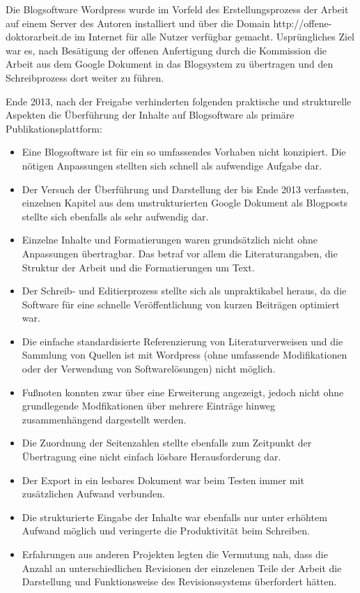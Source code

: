 Die Blogsoftware Wordpress wurde im Vorfeld des Erstellungsprozess der Arbeit auf einem Server des Autoren installiert und über die Domain http://offene-doktorarbeit.de im Internet für alle Nutzer verfügbar gemacht. Usprüngliches Ziel war es, nach Besätigung der offenen Anfertigung durch die Kommission die Arbeit aus dem Google Dokument in das Blogsystem zu übertragen und den Schreibprozess dort weiter zu führen.

Ende 2013, nach der Freigabe verhinderten folgenden praktische und strukturelle Aspekten die Überführung der Inhalte auf Blogsoftware als primäre Publikationsplattform:
\begin{itemize}
\item Eine Blogsoftware ist für ein so umfassendes Vorhaben nicht konzipiert. Die nötigen Anpassungen stellten sich schnell als aufwendige Aufgabe dar.
\item Der Versuch der Überführung und Darstellung der bis Ende 2013 verfassten, einzelnen Kapitel aus dem unstrukturierten Google Dokument als Blogposts stellte sich ebenfalls als sehr aufwendig dar.
\item  Einzelne Inhalte und Formatierungen waren grundsätzlich nicht ohne Anpassungen übertragbar. Das betraf vor allem die Literaturangaben, die Struktur der Arbeit und die Formatierungen um Text.
\item Der Schreib- und Editierprozess stellte sich als unpraktikabel heraus, da die Software für eine schnelle Veröffentlichung von kurzen Beiträgen optimiert war.
\item Die einfache standardisierte Referenzierung von Literaturverweisen und die Sammlung von Quellen ist mit Wordpress (ohne umfassende Modifikationen oder der Verwendung von Softwarelösungen) nicht möglich.
\item Fußnoten konnten zwar über eine Erweiterung angezeigt, jedoch nicht ohne grundlegende Modfikationen über mehrere Einträge hinweg zusammenhängend dargestellt werden.
\item Die Zuordnung der Seitenzahlen stellte ebenfalls zum Zeitpunkt der Übertragung eine nicht einfach lösbare Herausforderung dar.
\item Der Export in ein lesbares Dokument war beim Testen immer mit zusätzlichen Aufwand verbunden.
\item Die strukturierte Eingabe der Inhalte war ebenfalls nur unter erhöhtem Aufwand möglich und veringerte die Produktivität beim Schreiben.
\item Erfahrungen aus anderen Projekten legten die Vermutung nah, dass die Anzahl an unterschiedlichen Revisionen der einzelenen Teile der Arbeit die Darstellung und Funktionsweise des Revisionssystems überfordert hätten.
\end{itemize}

